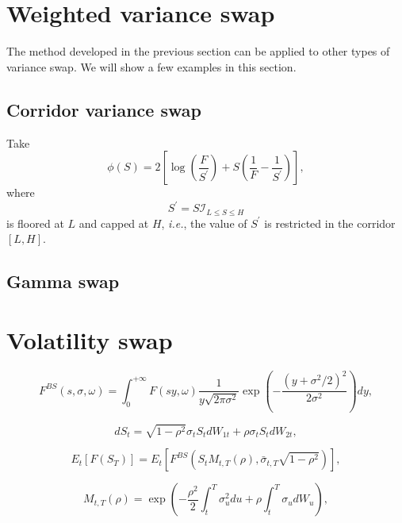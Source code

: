 \documentclass[12pt]{article}
\begin{document}
\section{Weighted variance swap}

  The method developed in the previous section can be applied to other types of variance swap. We will show a few examples in
  this section.

  \subsection{Corridor variance swap}

    Take
    \begin{equation}
      \phi(S) = 2\left[\log\left(\frac{F}{S^{\prime}}\right)+S\left(\frac{1}{F}-\frac{1}{S^{\prime}}\right)\right],
    \end{equation}
    where
    \begin{equation}
      S^{\prime} = S\mathcal{I}_{L\leq S \leq H}
    \end{equation}
    is floored at $L$ and capped at $H$, {\it i.e.}, the value of $S^{\prime}$ is restricted in the corridor $[L,H]$.

  \subsection{Gamma swap}


\section{Volatility swap}

  \begin{equation}
    F^{BS}\left(s, \sigma, \omega\right) = \int_0^{+\infty}F(sy,\omega)\frac{1}{y\sqrt{2\pi\sigma^2}}\exp\left(-\frac{\left(y+\sigma^2/2\right)^2}{2\sigma^2}\right)dy,
  \end{equation}

  \begin{equation}
    dS_t=\sqrt{1-\rho^2}\sigma_tS_tdW_{1t}+\rho\sigma_tS_tdW_{2t},
  \end{equation}

  \begin{equation}
    E_t\left[F(S_T)\right]=E_t\left[F^{BS}\left(S_tM_{t,T}(\rho),\bar\sigma_{t,T}\sqrt{1-\rho^2}\right)\right],
  \end{equation}

  \begin{equation}
    M_{t,T}(\rho) = \exp\left(-\frac{\rho^2}{2}\int_t^T\sigma_u^2du+\rho\int_t^T\sigma_udW_u\right),
  \end{equation}
\end{document}
